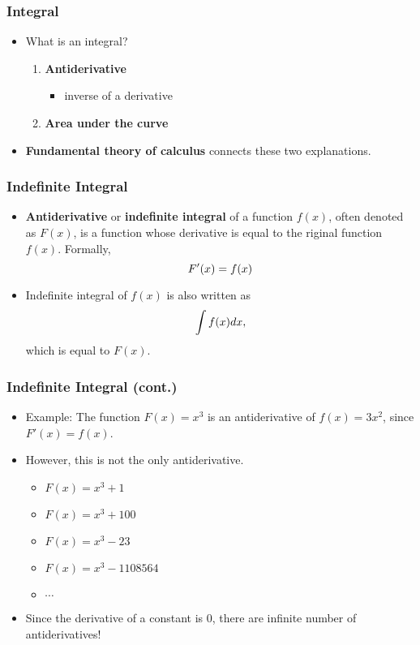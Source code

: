 \documentclass[pdflatex, 12pt]{beamer}
\begin{document}
\begin{frame}
\frametitle{Integral}
\begin{itemize}
\item What is an integral?
 \begin{enumerate}
 \item \textbf{Antiderivative}
  \begin{itemize}
  \item inverse of a derivative
  \end{itemize}
 \item \textbf{Area under the curve}
 \end{enumerate}
\vspace{0.4cm}
\item \textbf{Fundamental theory of calculus} connects these two explanations.
\end{itemize}
\end{frame}

\begin{frame}
\frametitle{Indefinite Integral}
\begin{itemize}
\item \textbf{Antiderivative} or \textbf{indefinite integral} of a function $f(x)$, often denoted as $F(x)$, is a function whose derivative is equal to the riginal function $f(x)$. Formally,
 \begin{equation}
 F'(x) = f(x) \notag 
 \end{equation} 
\item Indefinite integral of $f(x)$ is also written as 
 \begin{equation}
 \int f(x) dx, \notag 
 \end{equation}
which is equal to $F(x)$. 
\end{itemize}
\end{frame}

\begin{frame}
\frametitle{Indefinite Integral (cont.)}
\begin{itemize}
\item Example: The function $F(x) = x^3$ is an antiderivative of $f(x) = 3x^2$, since $F'(x) = f(x)$.
\vspace{0.4cm}
\item However, this is not the only antiderivative.
 \begin{itemize}
 \item $F(x) = x^3 + 1$
 \item $F(x) = x^3 + 100$
 \item $F(x) = x^3 - 23$
 \item $F(x) = x^3 - 1108564$
 \item $\cdots$
 \end{itemize}
\vspace{0.4cm}
\item Since the derivative of a constant is 0, there are infinite number of antiderivatives!
\end{itemize}	
\end{frame}
\end{document}
